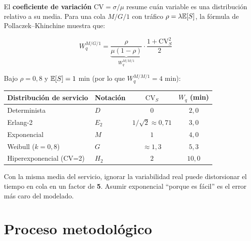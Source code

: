 \documentclass[11pt, letterpaper]{article}
\begin{document}
El \textbf{coeficiente de variación} $\text{CV} = \sigma/\mu$ resume cuán variable es una distribución relativo a su media. Para una cola $M/G/1$ con tráfico $\rho = \lambda\mathbb{E}[S]$, la fórmula de Pollaczek--Khinchine muestra que:

\[
W_q^{M/G/1} = \underbrace{\frac{\rho}{\mu(1-\rho)}}_{W_q^{M/M/1}} \cdot \frac{1 + \text{CV}_S^2}{2}
\]

\begin{ejemplobox}
Bajo $\rho = 0{,}8$ y $\mathbb{E}[S]=1$ min (por lo que $W_q^{M/M/1} = 4$ min):

\begin{center}
\small
\renewcommand{\arraystretch}{1.3}
\begin{tabular}{llcc}
\toprule
\textbf{Distribución de servicio} & \textbf{Notación} & $\text{CV}_S$ & $W_q$ (min) \\
\midrule
Determinista                       & $D$              & $0$                  & $2{,}0$ \\
Erlang-2                           & $E_2$            & $1/\sqrt{2}\approx 0{,}71$ & $3{,}0$ \\
Exponencial                        & $M$              & $1$                  & $4{,}0$ \\
Weibull ($k=0{,}8$)                & $G$              & $\approx 1{,}3$      & $5{,}3$ \\
Hiperexponencial (CV=2)            & $H_2$            & $2$                  & $10{,}0$ \\
\bottomrule
\end{tabular}
\end{center}

Con la misma media del servicio, ignorar la variabilidad real puede distorsionar el tiempo en cola en un factor de \textbf{5}. Asumir exponencial ``porque es fácil'' es el error más caro del modelado.
\end{ejemplobox}

\section{Proceso metodológico}
\end{document}
